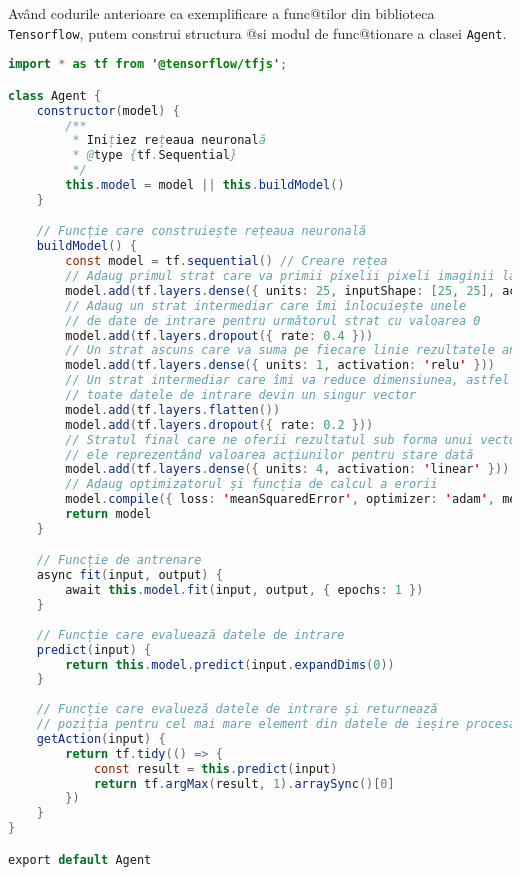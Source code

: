 Av\^ and codurile anterioare ca exemplificare a func@tilor din biblioteca \texttt{Tensorflow}, putem construi structura @si modul de func@tionare a clasei \texttt{Agent}.

\begin{lstlisting}[language=Java, caption={Structura clasei Agent}]
import * as tf from '@tensorflow/tfjs';

class Agent {
    constructor(model) {
        /**
         * Inițiez rețeaua neuronală
         * @type {tf.Sequential}
         */
        this.model = model || this.buildModel()
    }

    // Funcție care construiește rețeaua neuronală
    buildModel() {
        const model = tf.sequential() // Creare rețea
        // Adaug primul strat care va primii pixelii pixeli imaginii labirintului
        model.add(tf.layers.dense({ units: 25, inputShape: [25, 25], activation: 'relu' }))
        // Adaug un strat intermediar care îmi înlocuiește unele  
        // de date de intrare pentru următorul strat cu valoarea 0
        model.add(tf.layers.dropout({ rate: 0.4 }))
        // Un strat ascuns care va suma pe fiecare linie rezultatele anterioare
        model.add(tf.layers.dense({ units: 1, activation: 'relu' }))
        // Un strat intermediar care îmi va reduce dimensiunea, astfel din matrice toate
        // toate datele de intrare devin un singur vector
        model.add(tf.layers.flatten())
        model.add(tf.layers.dropout({ rate: 0.2 }))
        // Stratul final care ne oferii rezultatul sub forma unui vector de 4 elemente
        // ele reprezentând valoarea acțiunilor pentru stare dată
        model.add(tf.layers.dense({ units: 4, activation: 'linear' }))
        // Adaug optimizatorul și funcția de calcul a erorii
        model.compile({ loss: 'meanSquaredError', optimizer: 'adam', metrics: ['accuracy'] })
        return model
    }

    // Funcție de antrenare
    async fit(input, output) {
        await this.model.fit(input, output, { epochs: 1 })
    }
    
    // Funcție care evaluează datele de intrare
    predict(input) {
        return this.model.predict(input.expandDims(0))
    }
    
    // Funcție care evalueză datele de intrare și returnează
    // poziția pentru cel mai mare element din datele de ieșire procesate
    getAction(input) {
        return tf.tidy(() => {
            const result = this.predict(input)
            return tf.argMax(result, 1).arraySync()[0]
        })
    }
}

export default Agent
\end{lstlisting}

